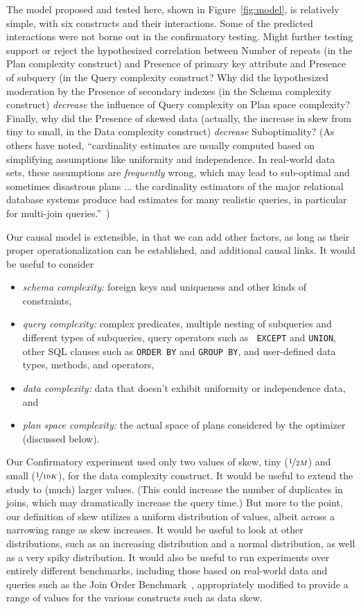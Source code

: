 \documentclass[prodmode,acmtods]{acmsmall}
\begin{document}
The model proposed and tested here, shown in Figure~\ref{fig:model}, is
relatively simple, with six constructs and their interactions. Some of the
predicted interactions were not borne out in the confirmatory testing. Might
further testing support or reject the hypothesized correlation between Number
of repeats (in the Plan complexity construct) and Presence of primary key
attribute and Presence of subquery (in the Query complexity construct? Why did the hypothesized moderation
  by the Presence of secondary indexes (in the Schema complexity construct)
  {\em decrease} the influence of Query complexity on Plan space complexity?
Finally, why did the Presence of skewed data (actually, the increase in skew
from tiny to small, in the Data complexity construct)
  {\em decrease} Suboptimality? (As others have noted, ``cardinality
  estimates are usually computed based on simplifying assumptions like
  uniformity and independence. In real-world data sets, these assumptions
  are {\em frequently} wrong, which may lead to sub-optimal and sometimes
  disastrous plans ... the cardinality estimators of the major relational
  database systems produce bad estimates for many realistic queries, in
  particular for multi-join queries.''~\cite{Leis15})

Our causal
model is extensible, in that we can add other factors, as long as their proper
operationalization can be established, and additional causal links. It would be
useful to consider
\begin{itemize}
\item {\em schema complexity:} foreign keys and
uniqueness and other kinds of constraints, 
\item {\em query complexity:} complex predicates, multiple nesting of
  subqueries and different types of subqueries, query operators such as {\tt
    EXCEPT} and {\tt UNION}, other
SQL clauses such as {\tt ORDER BY} and {\tt GROUP BY}, and user-defined data
types, methods, and operators,
\item {\em data complexity:} data that doesn't exhibit uniformity or independence
  data, and
\item {\em plan space complexity:} the actual space of plans considered by
  the optimizer (discussed below).
\end{itemize}

Our Confirmatory experiment used only two values of skew, tiny
($\nicefrac{1}{2M}$) and small ($\nicefrac{1}{10K}$), for the data complexity
construct. It would be useful to extend the study to (much) larger
values. (This could increase the number of duplicates in joins, which may
dramatically increase the query time.) But more to the point, our definition
of skew utilizes a uniform distribution of values, albeit across a narrowing
range as skew increases. It would be useful to look at other distributions,
such as an increasing distribution and a normal distribution, as well as a
very spiky distribution. It would also be useful to run experiments over
entirely different benchmarks, including those based on real-world data and
queries such as the Join Order Benchmark~\cite{Leis15}, appropriately
modified to provide a range of values for the various constructs such as
data skew.
\end{document}
